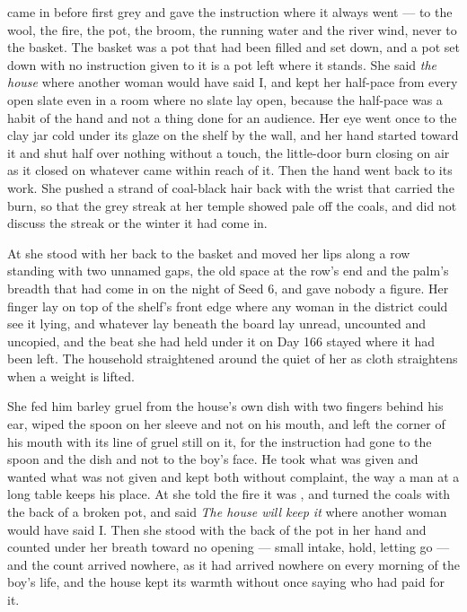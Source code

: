 \scenebreak

 came in before first grey and gave the instruction where it always went --- to the wool, the fire, the pot, the broom, the running water and the river wind, never to the basket. The basket was a pot that had been filled and set down, and a pot set down with no instruction given to it is a pot left where it stands. She said \emph{the house} where another woman would have said I, and kept her half-pace from every open slate even in a room where no slate lay open, because the half-pace was a habit of the hand and not a thing done for an audience. Her eye went once to the clay jar cold under its glaze on the shelf by the wall, and her hand started toward it and shut half over nothing without a touch, the little-door burn closing on air as it closed on whatever came within reach of it. Then the hand went back to its work. She pushed a strand of coal-black hair back with the wrist that carried the burn, so that the grey streak at her temple showed pale off the coals, and did not discuss the streak or the winter it had come in.

At  she stood with her back to the basket and moved her lips along a row standing with two unnamed gaps, the old space at the row's end and the palm's breadth that had come in on the night of Seed 6, and gave nobody a figure. Her finger lay on top of the shelf's front edge where any woman in the district could see it lying, and whatever lay beneath the board lay unread, uncounted and uncopied, and the beat she had held under it on Day 166 stayed where it had been left. The household straightened around the quiet of her as cloth straightens when a weight is lifted.

She fed him barley gruel from the house's own dish with two fingers behind his ear, wiped the spoon on her sleeve and not on his mouth, and left the corner of his mouth with its line of gruel still on it, for the instruction had gone to the spoon and the dish and not to the boy's face. He took what was given and wanted what was not given and kept both without complaint, the way a man at a long table keeps his place. At  she told the fire it was , and turned the coals with the back of a broken pot, and said \emph{The house will keep it} where another woman would have said I. Then she stood with the back of the pot in her hand and counted under her breath toward no opening --- small intake, hold, letting go --- and the count arrived nowhere, as it had arrived nowhere on every morning of the boy's life, and the house kept its warmth without once saying who had paid for it.

